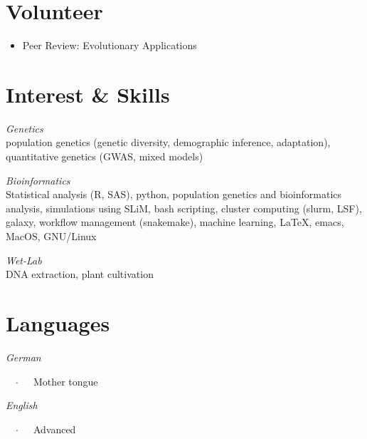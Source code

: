 \documentclass[margin,a4paper]{res}
\begin{document}
\begin{resume}

\section{Volunteer}
\begin{itemize}[leftmargin=0pt]\itemsep 2pt
\item[] Peer Review: Evolutionary Applications
\end{itemize}



\section{Interest \& Skills } 

{\sl{Genetics}}\\
population genetics (genetic diversity, demographic inference, adaptation), quantitative genetics (GWAS, mixed models)
 
{\sl{Bioinformatics}}\\
Statistical analysis (\textsf{R}, \textsc{SAS}), python, population genetics and bioinformatics analysis, simulations using SLiM, bash scripting, cluster computing (slurm, LSF), galaxy, workflow management (snakemake), machine learning, \LaTeX, emacs, MacOS, GNU/Linux

{\sl{Wet-Lab}}\\
DNA extraction, plant cultivation


\section{Languages}
\newlength{\langbox} 
\settowidth{\langbox}{Germang}
\parbox[t]{\langbox}{\sl{German}}\ \ $\cdotp$\ \ \ Mother tongue\\
\parbox[t]{\langbox}{\sl{English}}\ \ $\cdotp$\ \ \ Advanced


\end{resume}
\end{document}
